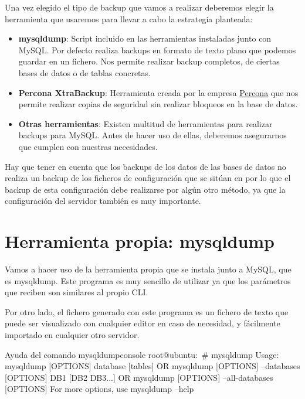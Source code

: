 Una vez elegido el tipo de backup que vamos a realizar deberemos elegir la herramienta que usaremos para llevar a cabo la estrategia planteada:

\begin{itemize}
    \item \textbf{mysqldump}: Script incluido en las herramientas instaladas junto con MySQL. Por defecto realiza backups en formato de texto plano que podemos guardar en un fichero. Nos permite realizar backup completos, de ciertas bases de datos o de tablas concretas.
    \item \textbf{Percona XtraBackup}: Herramienta creada por la empresa \href{https://www.percona.com/software/mysql-database/percona-xtrabackup}{Percona} que nos permite realizar copias de seguridad sin realizar bloqueos en la base de datos.
    \item \textbf{Otras herramientas}: Existen multitud de herramientas para realizar backups para MySQL. Antes de hacer uso de ellas, deberemos asegurarnos que cumplen con nuestras necesidades.
\end{itemize}

Hay que tener en cuenta que los backups de los datos de las bases de datos no realiza un backup de los ficheros de configuración que se sitúan en  por lo que el backup de esta configuración debe realizarse por algún otro método, ya que la configuración del servidor también es muy importante.


\section{Herramienta propia: mysqldump}
Vamos a hacer uso de la herramienta propia que se instala junto a MySQL, que es mysqldump. Este programa es muy sencillo de utilizar ya que los parámetros que reciben son similares al propio CLI.

Por otro lado, el fichero generado con este programa es un fichero de texto que puede ser visualizado con cualquier editor en caso de necesidad, y fácilmente importado en cualquier otro servidor.

\begin{mycode}{Ayuda del comando mysqldump}{console}{}
root@ubuntu:~# mysqldump
Usage: mysqldump [OPTIONS] database [tables]
OR     mysqldump [OPTIONS] --databases [OPTIONS] DB1 [DB2 DB3...]
OR     mysqldump [OPTIONS] --all-databases [OPTIONS]
For more options, use mysqldump --help
\end{mycode}

